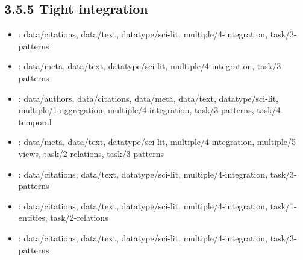 \begin {refsection}
\section [3.5.5 Tight integration] {3.5.5 Tight integration}

\begin {itemize}
\item \cite {schafer-2010-take-scientists-workbench:-semantic-search}:
    data/citations, data/text, datatype/sci-lit, multiple/4-integration, task/3-patterns


\item \cite {uren-2006-sensemaking-tools-for-understanding-research-literatures:}:
    data/meta, data/text, datatype/sci-lit, multiple/4-integration, task/3-patterns


\item \cite {heimerl-2016-citerivers:-visual-analysis-of-citation-patterns}:
    data/authors, data/citations, data/meta, data/text, datatype/sci-lit, multiple/1-aggregation, multiple/4-integration, task/3-patterns, task/4-temporal


\item \cite {goerg-2013-combining-computational-analyses-and-interactive-visualization}:
    data/meta, data/text, datatype/sci-lit, multiple/4-integration, multiple/5-views, task/2-relations, task/3-patterns


\item \cite {dietz-2007-unsupervised-prediction-of-citation-influences}:
    data/citations, data/text, datatype/sci-lit, multiple/4-integration, task/3-patterns


\item \cite {dunne-2012-rapid-understanding-of-scientific-paper-collections:}:
    data/citations, data/text, datatype/sci-lit, multiple/4-integration, task/1-entities, task/2-relations


\item \cite {gipp-2014-web-based-demonstration-of-semantic-similarity-detection}:
    data/citations, data/text, datatype/sci-lit, multiple/4-integration, task/3-patterns


\end {itemize}
\printbibliography
\end {refsection}\pagebreak

